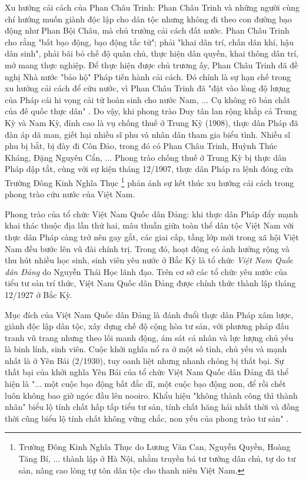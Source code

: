 Xu hướng cải cách của Phan Châu Trinh: Phan Châu Trinh và những người cùng chí hướng muốn giành độc lập cho dân tộc nhưng không đi theo con đường bạo động như Phan Bội Châu, mà chủ trưởng cải cách đất nước. Phan Châu Trinh cho rằng "bất bạo động, bạo động tắc tử"; phải "khai dân trí, chấn dân khí, hậu dân sinh", phải bãi bỏ chế độ quân chủ, thực hiện dân quyền, khai thông dân trí, mở mang thực nghiệp. Để thực hiện được chủ trương ấy, Phan Châu Trinh đã đề nghị Nhà nước "bảo hộ" Pháp tiến hành cải cách. Đó chính là sự hạn chế trong xu hướng cải cách để cứu nước, vì Phan Châu Trinh đã "đặt vào lòng độ lượng của Pháp cái hi vọng cải tử hoàn sinh cho nước Nam, ... Cụ không rõ bản chất của đế quốc thực dân" . Do vậy, khi phong trào Duy tân lan rộng khắp cả Trung Kỳ và Nam Kỳ, đỉnh cao là vụ chống thuế ở Trung Kỳ (1908), thực dân Pháp đã đàn áp dã man, giết hại nhiều sĩ phu và nhân dân tham gia biểu tình. Nhiều sĩ phu bị bắt, bị đày đi Côn Đảo, trong đó có Phan Châu Trinh, Huỳnh Thúc Kháng, Đặng Nguyên Cẩn, ... Phong trào chống thuế ở Trung Kỳ bị thực dân Pháp dập tắt, cùng với sự kiện tháng 12/1907, thực dân Pháp ra lệnh đóng cửa Trường Đông Kinh Nghĩa Thục \footnote{Trường Đông Kinh Nghĩa Thục do Lương Văn Can, Nguyễn Quyền, Hoàng Tăng Bí, ... thành lập ở Hà Nội, nhằm truyền bá tư tưởng dân chủ, tự do tư sản, nâng cao lòng tự tôn dân tộc cho thanh niên Việt Nam.} phản ánh sự kết thúc xu hướng cải cách trong phong trào cứu nước của Việt Nam.

Phong trào của tổ chức Việt Nam Quốc dân Đảng: khi thực dân Pháp đẩy mạnh khai thác thuộc địa lần thứ hai, mâu thuẫn giữa toàn thể dân tộc Việt Nam với thực dân Pháp càng trở nên gay gắt, các giai cấp, tầng lớp mới trong xã hội Việt Nam đều bước lên vũ đài chính trị. Trong đó, hoạt động có ảnh hưởng rộng và thu hút nhiều học sinh, sinh viên yêu nước ở Bắc Kỳ là tổ chức \textit{Việt Nam Quốc dân Đảng} do Nguyễn Thái Học lãnh đạo. Trên cơ sở các tổ chức yêu nước của tiểu tư sản trí thức, Việt Nam Quốc dân Đảng được chính thức thành lập tháng 12/1927 ở Bắc Kỳ.

Mục đích của Việt Nam Quốc dân Đảng là đánh đuổi thực dân Pháp xâm lược, giành độc lập dân tộc, xây dựng chế độ cộng hòa tư sản, với phương pháp đấu tranh vũ trang nhưng theo lối manh động, ám sát cá nhân và lực lượng chủ yếu là binh lính, sinh viên. Cuộc khởi nghĩa nổ ra ở một số tỉnh, chủ yếu và mạnh nhất là ở Yên Bái (2/1930), tuy oanh liệt nhưng nhanh chóng bị thất bại. Sự thất bại của khởi nghĩa Yên Bái của tổ chức Việt Nam Quốc dân Đảng đã thể hiện là "... một cuộc bạo động bất đắc dĩ, một cuộc bạo động non, để rồi chết luôn không bao giờ ngóc đầu lên nooiro. Khẩu hiệu "không thành công thì thành nhân" biểu lộ tính chất hấp tấp tiểu tư sản, tính chất hăng hái nhất thời và đồng thời cũng biểu lộ tính chất không vững chắc, non yếu của phong trào tư sản" .

